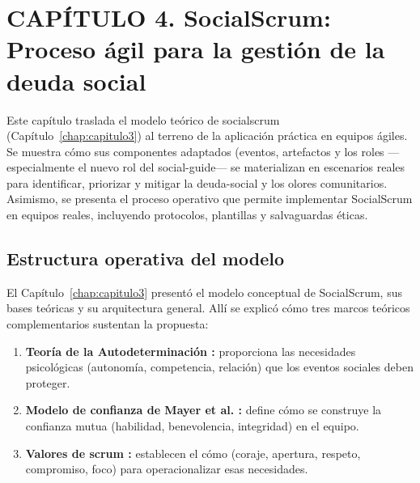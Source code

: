 \usetikzlibrary{positioning}

\chapter*{CAPÍTULO 4. SocialScrum: Proceso ágil para la gestión de la deuda social}
\setcounter{chapter}{4}
\setcounter{section}{0}
\setcounter{subsection}{0}
\setcounter{subsubsection}{0}
\renewcommand{\thesection}{\thechapter.\arabic{section}}
\renewcommand{\thesubsection}{\thesection.\arabic{subsection}}
\renewcommand{\thesubsubsection}{\thesubsection.\arabic{subsubsection}}
\makeatletter
\protected@edef\@currentlabel{\thechapter}%
\makeatother
\label{chap:capitulo4}

\setlength{\parindent}{0pt}

Este capítulo traslada el modelo teórico de \gls{socialscrum} (Capítulo~\ref{chap:capitulo3}) al terreno de la aplicación práctica en equipos ágiles. Se muestra cómo sus componentes adaptados (eventos, artefactos y los roles —especialmente el nuevo rol del \gls{social-guide}— se materializan en escenarios reales para identificar, priorizar y mitigar la \gls{deuda-social} y los olores comunitarios. Asimismo, se presenta el proceso operativo que permite implementar SocialScrum en equipos reales, incluyendo protocolos, plantillas y salvaguardas éticas.

\section{Estructura operativa del modelo}

El Capítulo~\ref{chap:capitulo3} presentó el modelo conceptual de SocialScrum, sus bases teóricas y su arquitectura general. Allí se explicó cómo tres marcos teóricos complementarios sustentan la propuesta:

\begin{enumerate}
    \item \textbf{Teoría de la Autodeterminación \cite{ryan2000self}:} proporciona las necesidades psicológicas (autonomía, competencia, relación) que los eventos sociales deben proteger.
    \item \textbf{Modelo de confianza de Mayer et al. \cite{mayer1995integrative}:} define cómo se construye la confianza mutua (habilidad, benevolencia, integridad) en el equipo.
    \item \textbf{Valores de \gls{scrum} \cite{schwaber2020scrum}:} establecen el cómo (coraje, apertura, respeto, compromiso, foco) para operacionalizar esas necesidades.
\end{enumerate}

